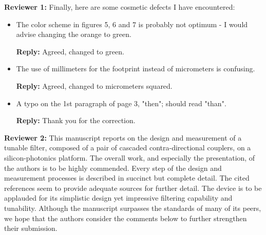 \documentclass[]{letter}
\begin{document}
\textbf{Reviewer 1:} Finally, here are some cosmetic defects I have encountered:
\begin{itemize}
\item The color scheme in figures 5, 6 and 7 is probably not optimum - I would advise changing the orange to green.

\textbf{Reply:} Agreed, changed to green.

\item The use of millimeters for the footprint instead of micrometers is confusing.

\textbf{Reply:} Agreed, changed to micrometers squared.

\item A typo on the 1st paragraph of page 3, "then"; should read "than".

\textbf{Reply:} Thank you for the correction.
	
\end{itemize}


\textbf{Reviewer 2:} This manuscript reports on the design and measurement of a tunable filter, composed of a pair of cascaded contra-directional couplers, on a silicon-photonics platform. The overall work, and especially the presentation, of the authors is to be highly commended. Every step of the design and measurement processes is described in succinct but complete detail. The cited references seem to provide adequate sources for further detail. The device is to be applauded for its simplistic design yet impressive filtering capability and tunability. Although the manuscript surpasses the standards of many of its peers, we hope that the authors consider the comments below to further strengthen their submission.
\end{document}
